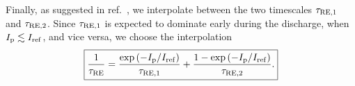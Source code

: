 \documentclass{notes}
\newcommand{\Ip}{I_{\rm p}}
\begin{document}
    Finally, as suggested in ref.~\cite{Mineev2021}, we interpolate between
    the two timescales $\tau_{\rm RE,1}$ and $\tau_{\rm RE,2}$. Since
    $\tau_{\rm RE,1}$ is expected to dominate early during the discharge, when
    $\Ip\lesssim I_{\rm ref}$, and vice versa, we choose the interpolation
    \begin{equation}
        \boxed{
            \frac{1}{\tau_{\rm RE}} = \frac{\exp\left(-\Ip/I_{\rm ref}\right)}{\tau_{\rm RE,1}}
            + \frac{1-\exp\left(-\Ip/I_{\rm ref}\right)}{\tau_{\rm RE,2}}.
        }
    \end{equation}

\end{document}
